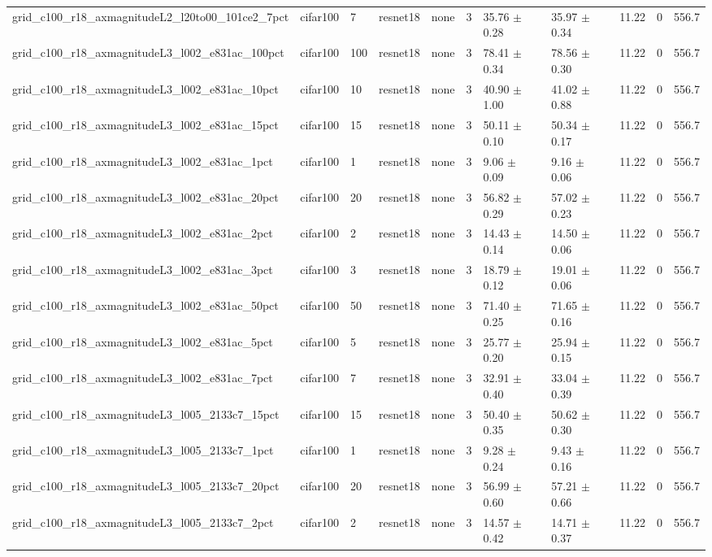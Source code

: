 \begin{tabular}{lllllllllll}
grid_c100_r18_axmagnitudeL2_l20to00_101ce2_7pct & cifar100 & 7 & resnet18 & none & 3 & 35.76 $\pm$ 0.28 & 35.97 $\pm$ 0.34 & 11.22 & 0 & 556.7 \\
grid_c100_r18_axmagnitudeL3_l002_e831ac_100pct & cifar100 & 100 & resnet18 & none & 3 & 78.41 $\pm$ 0.34 & 78.56 $\pm$ 0.30 & 11.22 & 0 & 556.7 \\
grid_c100_r18_axmagnitudeL3_l002_e831ac_10pct & cifar100 & 10 & resnet18 & none & 3 & 40.90 $\pm$ 1.00 & 41.02 $\pm$ 0.88 & 11.22 & 0 & 556.7 \\
grid_c100_r18_axmagnitudeL3_l002_e831ac_15pct & cifar100 & 15 & resnet18 & none & 3 & 50.11 $\pm$ 0.10 & 50.34 $\pm$ 0.17 & 11.22 & 0 & 556.7 \\
grid_c100_r18_axmagnitudeL3_l002_e831ac_1pct & cifar100 & 1 & resnet18 & none & 3 & 9.06 $\pm$ 0.09 & 9.16 $\pm$ 0.06 & 11.22 & 0 & 556.7 \\
grid_c100_r18_axmagnitudeL3_l002_e831ac_20pct & cifar100 & 20 & resnet18 & none & 3 & 56.82 $\pm$ 0.29 & 57.02 $\pm$ 0.23 & 11.22 & 0 & 556.7 \\
grid_c100_r18_axmagnitudeL3_l002_e831ac_2pct & cifar100 & 2 & resnet18 & none & 3 & 14.43 $\pm$ 0.14 & 14.50 $\pm$ 0.06 & 11.22 & 0 & 556.7 \\
grid_c100_r18_axmagnitudeL3_l002_e831ac_3pct & cifar100 & 3 & resnet18 & none & 3 & 18.79 $\pm$ 0.12 & 19.01 $\pm$ 0.06 & 11.22 & 0 & 556.7 \\
grid_c100_r18_axmagnitudeL3_l002_e831ac_50pct & cifar100 & 50 & resnet18 & none & 3 & 71.40 $\pm$ 0.25 & 71.65 $\pm$ 0.16 & 11.22 & 0 & 556.7 \\
grid_c100_r18_axmagnitudeL3_l002_e831ac_5pct & cifar100 & 5 & resnet18 & none & 3 & 25.77 $\pm$ 0.20 & 25.94 $\pm$ 0.15 & 11.22 & 0 & 556.7 \\
grid_c100_r18_axmagnitudeL3_l002_e831ac_7pct & cifar100 & 7 & resnet18 & none & 3 & 32.91 $\pm$ 0.40 & 33.04 $\pm$ 0.39 & 11.22 & 0 & 556.7 \\
grid_c100_r18_axmagnitudeL3_l005_2133c7_15pct & cifar100 & 15 & resnet18 & none & 3 & 50.40 $\pm$ 0.35 & 50.62 $\pm$ 0.30 & 11.22 & 0 & 556.7 \\
grid_c100_r18_axmagnitudeL3_l005_2133c7_1pct & cifar100 & 1 & resnet18 & none & 3 & 9.28 $\pm$ 0.24 & 9.43 $\pm$ 0.16 & 11.22 & 0 & 556.7 \\
grid_c100_r18_axmagnitudeL3_l005_2133c7_20pct & cifar100 & 20 & resnet18 & none & 3 & 56.99 $\pm$ 0.60 & 57.21 $\pm$ 0.66 & 11.22 & 0 & 556.7 \\
grid_c100_r18_axmagnitudeL3_l005_2133c7_2pct & cifar100 & 2 & resnet18 & none & 3 & 14.57 $\pm$ 0.42 & 14.71 $\pm$ 0.37 & 11.22 & 0 & 556.7 \\

\end{tabular}
